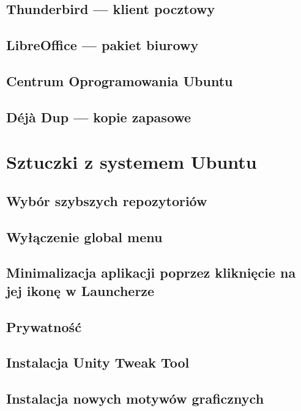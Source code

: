 \documentclass[a4paper,11pt,oneside]{mwart}
\begin{document}
		\subsection{Thunderbird --- klient pocztowy}
			
		\subsection{LibreOffice --- pakiet biurowy}
			 
		\subsection{Centrum Oprogramowania Ubuntu}
			
		\subsection{Déjà Dup --- kopie zapasowe}
			
	\section{Sztuczki z systemem Ubuntu}
		
		\subsection{Wybór szybszych repozytoriów}
			
		\subsection{Wyłączenie global menu}
			
		\subsection{Minimalizacja aplikacji poprzez kliknięcie na jej ikonę w Launcherze}
			
		\subsection{Prywatność}
			
		\subsection{Instalacja Unity Tweak Tool}
			
		\subsection{Instalacja nowych motywów graficznych}
			
\end{document}
